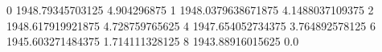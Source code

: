 0 1948.79345703125 4.904296875
1 1948.0379638671875 4.1488037109375
2 1948.617919921875 4.728759765625
4 1947.654052734375 3.764892578125
6 1945.603271484375 1.714111328125
8 1943.88916015625 0.0
